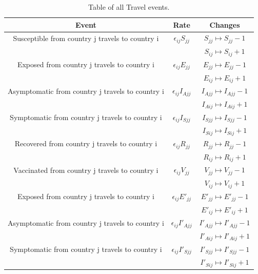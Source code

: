 \documentclass[a4paper,11pt]{article}
\theoremstyle{plain}
\theoremstyle{definition}
\begin{document}
\begin{table}[hbtp]
		\begin{center}
			\caption{Table of all Travel events.}
			\begin{tabular}{ c|c|c }
				Event & Rate & Changes \\ 
	        	\hline
		        \hline
		        Susceptible from country j travels to country i & $\epsilon_{ij} S_{jj}$ & $S_{jj} \mapsto S_{jj} - 1$ \\
		        &  &  $S_{ij} \mapsto S_{ij} + 1$\\
		        \hline
		        Exposed from country j travels to country i & $\epsilon_{ij} E_{jj}$ & $E_{jj} \mapsto E_{jj} - 1$ \\
		         &  &  $E_{ij} \mapsto E_{ij} + 1$\\
		        \hline
		        Asymptomatic from country j travels to country i & $\epsilon_{ij} I_{Ajj}$ & $I_{Ajj} \mapsto I_{Ajj} - 1$ \\
		        &  &  $I_{Aij} \mapsto I_{Aij} + 1$\\
	        	\hline
	        	Symptomatic from country j travels to country i & $\epsilon_{ij} I_{Sjj}$ & $I_{Sjj} \mapsto I_{Sjj} - 1$ \\
		        &  &  $I_{Sij} \mapsto I_{Sij} + 1$\\
	        	\hline
	        	Recovered from country j travels to country i & $\epsilon_{ij} R_{jj}$ & $R_{jj} \mapsto R_{jj} - 1$ \\
		        &  &  $R_{ij} \mapsto R_{ij} + 1$\\
	        	\hline
	        	Vaccinated from country j travels to country i & $\epsilon_{ij} V_{jj}$ & $V_{jj} \mapsto V_{jj} - 1$ \\
		        &  &  $V_{ij} \mapsto V_{ij} + 1$\\
	        	\hline
	        	Exposed from country j travels to country i & $\epsilon_{ij} E'_{jj}$ & $E'_{jj} \mapsto E'_{jj} - 1$ \\
		        &  &  $E'_{ij} \mapsto E'_{ij} + 1$\\
	        	\hline
	        	Asymptomatic from country j travels to country i & $\epsilon_{ij} I'_{Ajj}$ & $I'_{Ajj} \mapsto I'_{Ajj} - 1$ \\
		        &  &  $I'_{Aij} \mapsto I'_{Aij} + 1$\\
	        	\hline
	        	Symptomatic from country j travels to country i & $\epsilon_{ij} I'_{Sjj}$ & $I'_{Sjj} \mapsto I'_{Sjj} - 1$ \\
		        &  &  $I'_{Sij} \mapsto I'_{Sij} + 1$\\

\end{tabular}
\end{center}
\end{table}
\end{document}
